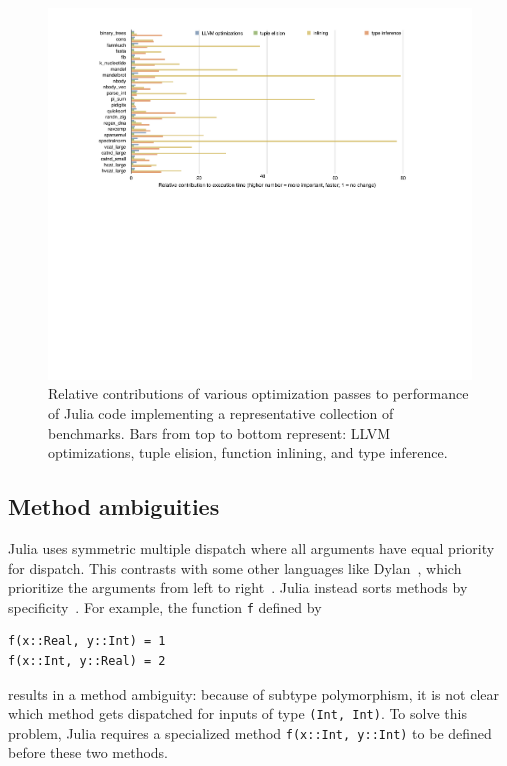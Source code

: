 \documentclass[10pt, preprint]{sigplanconf}
\begin{document}
\begin{figure}
	\includegraphics[width=\textwidth]{fig-timings}
	\caption{Relative contributions of various optimization passes to
	performance of Julia code implementing a representative collection
	of benchmarks. Bars from top to bottom represent: LLVM
	optimizations, tuple elision, function inlining, and type inference.}
	\label{fig:timings}
\end{figure}


\subsection{Method ambiguities}

Julia uses symmetric multiple dispatch where all arguments have equal priority
for dispatch. This contrasts with some other languages like
Dylan~\cite{dylanman}, which
prioritize the arguments from left to right~\cite{Agrawal1991}. Julia instead
sorts methods by specificity~\cite{Bezanson2012}. For example, the function
\verb|f| defined by 

\begin{lstlisting}
f(x::Real, y::Int) = 1
f(x::Int, y::Real) = 2
\end{lstlisting}
%
results in a method ambiguity: because of subtype polymorphism, it is not clear
which method gets dispatched for inputs of type \verb|(Int, Int)|. To solve
this problem, Julia
requires a specialized method \verb|f(x::Int, y::Int)| to be defined before
these two methods.
\end{document}
